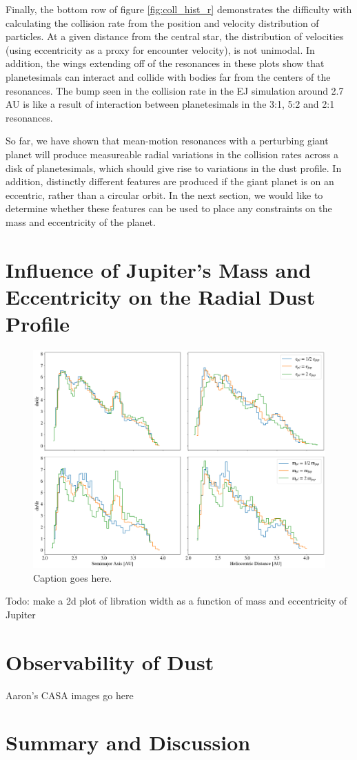 \documentclass[onecolumn]{aastex63}
\begin{document}
Finally, the bottom row of figure \ref{fig:coll_hist_r} demonstrates the difficulty with calculating the collision rate from the position and velocity 
distribution of particles. At a given distance from the central star, the distribution of velocities (using eccentricity as a proxy for encounter 
velocity), is not unimodal. In addition, the wings extending off of the resonances in these plots show that planetesimals can interact and collide 
with bodies far from the centers of the resonances. The bump seen in the collision rate in the EJ simulation around 2.7 AU is like a result of interaction between planetesimals in the 3:1, 5:2 and 2:1 resonances.

So far, we have shown that mean-motion resonances with a perturbing giant planet will produce measureable radial variations in the collision rates across a disk of planetesimals, which should give rise to variations in the dust profile. In addition, distinctly different features are produced if the giant planet is on an eccentric, rather than a circular orbit. In the next section, we would like to determine whether these features can be used to place any constraints on the mass and eccentricity of the planet.

\section{Influence of Jupiter's Mass and Eccentricity on the Radial Dust Profile}

\begin{figure}
    \includegraphics[width=\textwidth]{figures/coll_hist_e_and_m.png}
    \caption{Caption goes here.\label{fig:coll_hist_e_and_m}}
\end{figure}

Todo: make a 2d plot of libration width as a function of mass and eccentricity of Jupiter

\section{Observability of Dust} \label{sec:dust}

Aaron's CASA images go here

\section{Summary and Discussion} \label{sec:discuss}



\clearpage
\end{document}
